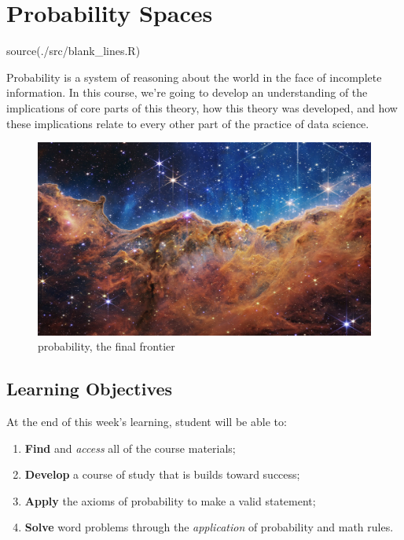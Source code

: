 \documentclass[
]{book}
\newenvironment{Shaded}{\begin{snugshade}}{\end{snugshade}}
\newcommand{\FunctionTok}[1]{\textcolor[rgb]{0.00,0.00,0.00}{#1}}
\newcommand{\NormalTok}[1]{#1}
\newcommand{\StringTok}[1]{\textcolor[rgb]{0.31,0.60,0.02}{#1}}
\providecommand{\tightlist}{%
  \setlength{\itemsep}{0pt}\setlength{\parskip}{0pt}}
\theoremstyle{definition}
\theoremstyle{definition}
\theoremstyle{definition}
\theoremstyle{definition}
\theoremstyle{remark}
\begin{document}
\hypertarget{probability-spaces}{%
\chapter{Probability Spaces}\label{probability-spaces}}

\begin{Shaded}
\begin{Highlighting}[]
\FunctionTok{source}\NormalTok{(}\StringTok{\textquotesingle{}./src/blank\_lines.R\textquotesingle{}}\NormalTok{)}
\end{Highlighting}
\end{Shaded}

Probability is a system of reasoning about the world in the face of incomplete information. In this course, we're going to develop an understanding of the implications of core parts of this theory, how this theory was developed, and how these implications relate to every other part of the practice of data science.

\begin{figure}
\centering
\includegraphics{./images/webb.jpg}
\caption{probability, the final frontier}
\end{figure}

\hypertarget{learning-objectives}{%
\section{Learning Objectives}\label{learning-objectives}}

At the end of this week's learning, student will be able to:

\begin{enumerate}
\def\labelenumi{\arabic{enumi}.}
\tightlist
\item
  \textbf{Find} and \emph{access} all of the course materials;
\item
  \textbf{Develop} a course of study that is builds toward success;
\item
  \textbf{Apply} the axioms of probability to make a valid statement;
\item
  \textbf{Solve} word problems through the \emph{application} of probability and math rules.
\end{enumerate}
\end{document}
